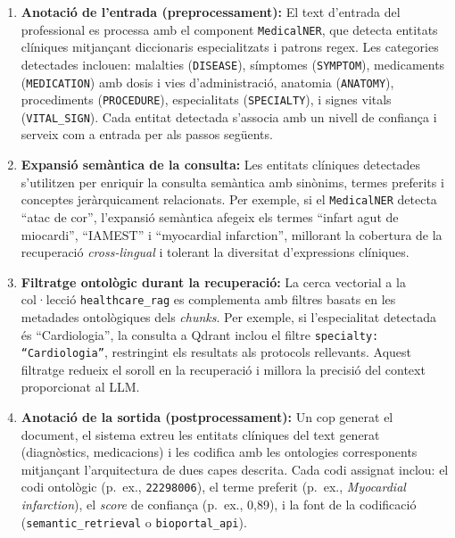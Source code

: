\documentclass[CAT]{TFUOC}%
\begin{document}
\begin{enumerate}
    \item \textbf{Anotació de l'entrada (preprocessament):} El text d'entrada del professional es processa amb el component \texttt{MedicalNER}, que detecta entitats clíniques mitjançant diccionaris especialitzats i patrons regex. Les categories detectades inclouen: malalties (\texttt{DISEASE}), símptomes (\texttt{SYMPTOM}), medicaments (\texttt{MEDICATION}) amb dosis i vies d'administració, anatomia (\texttt{ANATOMY}), procediments (\texttt{PROCEDURE}), especialitats (\texttt{SPECIALTY}), i signes vitals (\texttt{VITAL\_SIGN}). Cada entitat detectada s'associa amb un nivell de confiança i serveix com a entrada per als passos següents.

    \item \textbf{Expansió semàntica de la consulta:} Les entitats clíniques detectades s'utilitzen per enriquir la consulta semàntica amb sinònims, termes preferits i conceptes jeràrquicament relacionats. Per exemple, si el \texttt{MedicalNER} detecta ``atac de cor'', l'expansió semàntica afegeix els termes ``infart agut de miocardi'', ``IAMEST'' i ``myocardial infarction'', millorant la cobertura de la recuperació \textit{cross-lingual} i tolerant la diversitat d'expressions clíniques.

    \item \textbf{Filtratge ontològic durant la recuperació:} La cerca vectorial a la col·lecció \texttt{healthcare\_rag} es complementa amb filtres basats en les metadades ontològiques dels \textit{chunks}. Per exemple, si l'especialitat detectada és ``Cardiologia'', la consulta a Qdrant inclou el filtre \texttt{specialty: ``Cardiologia''}, restringint els resultats als protocols rellevants. Aquest filtratge redueix el soroll en la recuperació i millora la precisió del context proporcionat al LLM.

    \item \textbf{Anotació de la sortida (postprocessament):} Un cop generat el document, el sistema extreu les entitats clíniques del text generat (diagnòstics, medicacions) i les codifica amb les ontologies corresponents mitjançant l'arquitectura de dues capes descrita. Cada codi assignat inclou: el codi ontològic (p.~ex., \texttt{22298006}), el terme preferit (p.~ex., \textit{Myocardial infarction}), el \textit{score} de confiança (p.~ex., 0,89), i la font de la codificació (\texttt{semantic\_retrieval} o \texttt{bioportal\_api}).
\end{enumerate}
\end{document}

